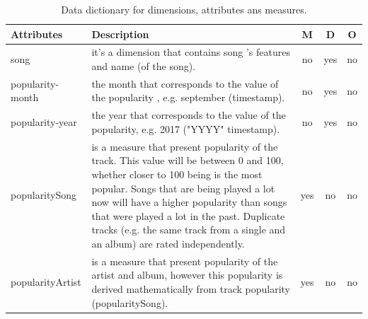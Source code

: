 \documentclass[12pt]{article}
\begin{document}
\begin{table}[h!]
\begin{center}
\begin{tabular}{@{}|l|p{9cm}|c|c|c|@{}} 
\toprule
Attributes & Description & M & D & O \\ [0.5ex] \midrule
song & it's a dimension that contains song 's features and name (of the song). & no & yes & no \\ \bottomrule \midrule
popularity-month & the month that corresponds to the value of the popularity , e.g. september (timestamp). & no & yes & no \\ \hline
popularity-year & the year that corresponds to the value of the popularity, e.g. 2017 ("YYYY" timestamp). & no & yes & no \\ \bottomrule \midrule
popularitySong & is a measure that present popularity of the track. This value will be between 0 and 100, whether closer to 100 being is the most popular.
Songs that are being played a lot now will have a higher popularity than songs that were played a lot in the past. Duplicate tracks (e.g. the same track from a single and an album) are rated independently. & yes & no & no \\ \hline
popularityArtist & is a measure that present popularity of the artist and album, however this popularity is derived mathematically from track popularity (popularitySong). & yes & no & no \\ \bottomrule \midrule
\end{tabular}
\caption{Data dictionary for dimensions, attributes ans measures.}
\label{table:2}
\end{center}
\end{table}
\FloatBarrier
\end{document}
